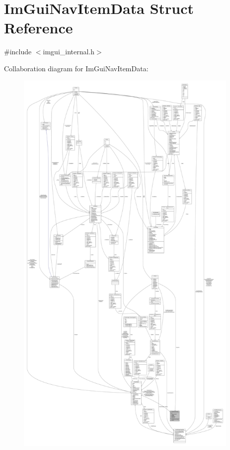 \hypertarget{structImGuiNavItemData}{}\section{Im\+Gui\+Nav\+Item\+Data Struct Reference}
\label{structImGuiNavItemData}


{\ttfamily \#include $<$imgui\+\_\+internal.\+h$>$}



Collaboration diagram for Im\+Gui\+Nav\+Item\+Data\+:
\nopagebreak
\begin{figure}[H]
\begin{center}
\leavevmode
\includegraphics[height=550pt]{structImGuiNavItemData__coll__graph}
\end{center}
\end{figure}
